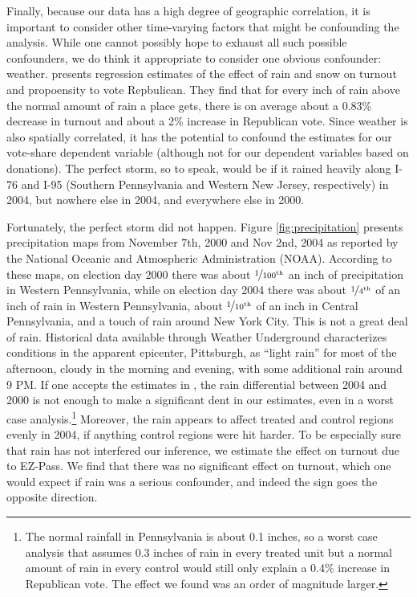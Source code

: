 
Finally, because our data has a high degree of geographic correlation, it is important to consider other time-varying factors that might be confounding the analysis. While one cannot possibly hope to exhaust all such possible confounders, we do think it appropriate to consider one obvious confounder: weather. \textcite{Gomez2007} presents regression estimates of the effect of rain and snow on turnout and propoensity to vote Repbulican. They find that for every inch of rain above the normal amount of rain a place gets, there is on average about a 0.83\% decrease in turnout and about a 2\% increase in Republican vote. Since weather is also spatially correlated, it has the potential to confound the estimates for our vote-share dependent variable (although not for our dependent variables based on donations). The perfect storm, so to speak, would be if it rained heavily along I-76 and I-95 (Southern Pennsylvania and Western New Jersey, respectively) in 2004, but nowhere else in 2004, and everywhere else in 2000. 

Fortunately, the perfect storm did not happen.  Figure \ref{fig:precipitation} presents precipitation maps from November 7th, 2000 and Nov 2nd, 2004 as reported by the National Oceanic and Atmospheric Administration (NOAA). According to these maps, on election day 2000 there was about $\nicefrac{1}{100^{\mathrm{th}}}$ an inch of precipitation in Western Pennsylvania, while on election day 2004 there was about $\nicefrac{1}{4^{\mathrm{th}}}$ of an inch of rain in Western Pennsylvania, about $\nicefrac{1}{10^{\mathrm{th}}}$ of an inch in Central Pennsylvania, and a touch of rain around New York City. This is not a great deal of rain. Historical data available through Weather Underground characterizes conditions in the apparent epicenter, Pittsburgh, as ``light rain'' for most of the afternoon, cloudy in the morning and evening, with some additional rain around 9 PM. If one accepts the estimates in \textcite{Gomez2007}, the rain differential between 2004 and 2000 is not enough to make a significant dent in our estimates, even in a worst case analysis.\footnote{The normal rainfall in Pennsylvania is about 0.1 inches, so a worst case analysis that assumes 0.3 inches of rain in every treated unit but a normal amount of rain in every control would still only explain a 0.4\% increase in Republican vote. The effect we found was an order of magnitude larger. }  Moreover, the rain appears to affect treated and control regions evenly in 2004, if anything control regions were hit harder. To be especially sure that rain has not interfered our inference, we estimate the effect on turnout due to EZ-Pass.  We find that there was no significant effect on turnout, which one would expect if rain was a serious confounder, and indeed the sign goes the opposite direction.

